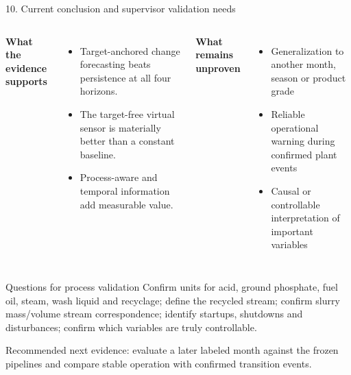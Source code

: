 \documentclass[10pt,aspectratio=169]{beamer}
\newcommand{\smallnote}[1]{{\scriptsize\color{Gray}#1}}
\begin{document}
\begin{frame}{10. Current conclusion and supervisor validation needs}
  \begin{columns}[T,onlytextwidth]
      \textbf{What the evidence supports}
      \begin{itemize}
        \item Target-anchored change forecasting beats persistence at all four horizons.
        \item The target-free virtual sensor is materially better than a constant baseline.
        \item Process-aware and temporal information add measurable value.
      \end{itemize}
      \textbf{What remains unproven}
      \begin{itemize}
        \item Generalization to another month, season or product grade
        \item Reliable operational warning during confirmed plant events
        \item Causal or controllable interpretation of important variables
      \end{itemize}
  \end{columns}

  \vspace{0.2cm}
  \begin{block}{Questions for process validation}
    Confirm units for acid, ground phosphate, fuel oil, steam, wash liquid and recyclage; define the recycled stream; confirm slurry mass/volume stream correspondence; identify startups, shutdowns and disturbances; confirm which variables are truly controllable.
  \end{block}

  \smallnote{Recommended next evidence: evaluate a later labeled month against the frozen pipelines and compare stable operation with confirmed transition events.}
\end{frame}
\end{document}
